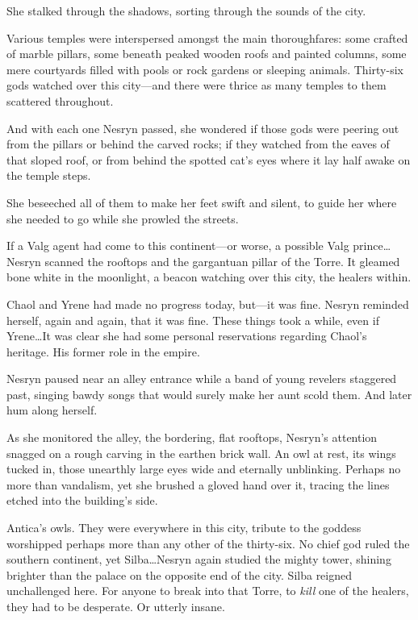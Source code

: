 She stalked through the shadows, sorting through the sounds of the city.

Various temples were interspersed amongst the main thoroughfares: some crafted of marble pillars, some beneath peaked wooden roofs and painted columns, some mere courtyards filled with pools or rock gardens or sleeping animals.
Thirty-six gods watched over this city---and there were thrice as many temples to them scattered throughout.

And with each one Nesryn passed, she wondered if those gods were peering out from the pillars or behind the carved rocks; if they watched from the eaves of that sloped roof, or from behind the spotted cat's eyes where it lay half awake on the temple steps.

She beseeched all of them to make her feet swift and silent, to guide her where she needed to go while she prowled the streets.

If a Valg agent had come to this continent---or worse, a possible Valg prince\ldots Nesryn scanned the rooftops and the gargantuan pillar of the Torre.
It gleamed bone white in the moonlight, a beacon watching over this city, the healers within.

Chaol and Yrene had made no progress today, but---it was fine.
Nesryn reminded herself, again and again, that it was fine.
These things took a while, even if Yrene\ldots It was clear she had some personal reservations regarding Chaol's heritage.
His former role in the empire.

Nesryn paused near an alley entrance while a band of young revelers staggered past, singing bawdy songs that would surely make her aunt scold them.
And later hum along herself.

As she monitored the alley, the bordering, flat rooftops, Nesryn's attention snagged on a rough carving in the earthen brick wall.
An owl at rest, its wings tucked in, those unearthly large eyes wide and eternally unblinking.
Perhaps no more than vandalism, yet she brushed a gloved hand over it, tracing the lines etched into the building's side.

Antica's owls.
They were everywhere in this city, tribute to the goddess worshipped perhaps more than any other of the thirty-six.
No chief god ruled the southern continent, yet Silba\ldots Nesryn again studied the mighty tower, shining brighter than the palace on the opposite end of the city.
Silba reigned unchallenged here.
For anyone to break into that Torre, to \emph{kill} one of the healers, they had to be desperate.
Or utterly insane.

